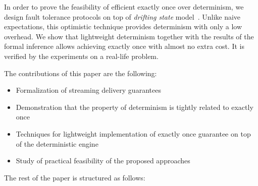 In order to prove the feasibility of efficient exactly once over determinism, we design fault tolerance protocols on top of {\em drifting state} model~\cite{we2018adbis}. Unlike naive expectations, this optimistic technique provides determinism with only a low overhead. We show that lightweight determinism together with the results of the formal inference allows achieving exactly once with almost no extra cost. It is verified by the experiments on a real-life problem.

The contributions of this paper are the following: 
\begin{itemize}
    \item Formalization of streaming delivery guarantees 
    \item Demonstration that the property of determinism is tightly related to exactly once
    \item Techniques for lightweight implementation of exactly once guarantee on top of the deterministic engine
    \item Study of practical feasibility of the proposed approaches
\end{itemize}

The rest of the paper is structured as follows: 